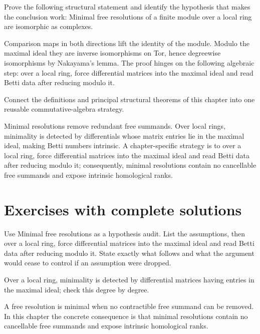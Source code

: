 \begin{problem}\label{prob:v25-problem-11}
Prove the following structural statement and identify the hypothesis that makes the conclusion work: Minimal free resolutions of a finite module over a local ring are isomorphic as complexes.
\end{problem}
\begin{solution}
Comparison maps in both directions lift the identity of the module. Modulo the maximal ideal they are inverse isomorphisms on Tor, hence degreewise isomorphisms by Nakayama's lemma. The proof hinges on the following algebraic step: over a local ring, force differential matrices into the maximal ideal and read Betti data after reducing modulo it.
\end{solution}

\begin{problem}\label{prob:v25-problem-12}
Connect the definitions and principal structural theorems of this chapter into one reusable commutative-algebra strategy.
\end{problem}
\begin{solution}
Minimal resolutions remove redundant free summands. Over local rings, minimality is detected by differentials whose matrix entries lie in the maximal ideal, making Betti numbers intrinsic. A chapter-specific strategy is to over a local ring, force differential matrices into the maximal ideal and read Betti data after reducing modulo it; consequently, minimal resolutions contain no cancellable free summands and expose intrinsic homological ranks.
\end{solution}

\section{Exercises with complete solutions}

\begin{exercise}\label{exr:v25-01}
Use Minimal free resolutions as a hypothesis audit. List the assumptions, then over a local ring, force differential matrices into the maximal ideal and read Betti data after reducing modulo it. State exactly what follows and what the argument would cease to control if an assumption were dropped.
\end{exercise}
\begin{hint}
Over a local ring, minimality is detected by differential matrices having entries in the maximal ideal; check this degree by degree.
\end{hint}
\begin{solution}
A free resolution is minimal when no contractible free summand can be removed. In this chapter the concrete consequence is that minimal resolutions contain no cancellable free summands and expose intrinsic homological ranks.
\end{solution}

